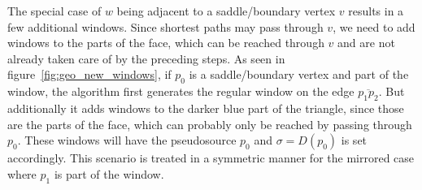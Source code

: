 The special case of $w$ being adjacent to a saddle/boundary vertex $v$ results in a few additional windows.
Since shortest paths may pass through $v$, we need to add windows to the parts of the face, which can be reached through $v$ and are not already taken care of by the preceding steps.
As seen in figure~\ref{fig:geo_new_windows}, if $p_0$ is a saddle/boundary vertex and part of the window, the algorithm first generates the regular window on the edge $\overline{p_1p_2}$.
But additionally it adds windows to the darker blue part of the triangle, since those are the parts of the face, which can probably only be reached by passing through $p_0$.
These windows will have the pseudosource $p_0$ and $\sigma = D(p_0)$ is set accordingly.
This scenario is treated in a symmetric manner for the mirrored case where $p_1$ is part of the window.

